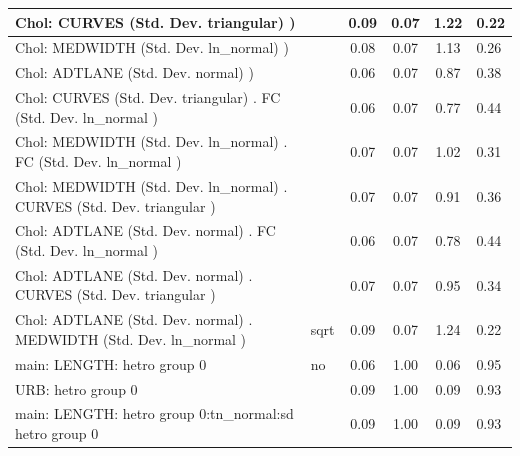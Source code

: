 \begin{table}
\begin{center}
\begin{tabular}{|l|l|c|c|c|l|}
			\hline
			 Chol: CURVES (Std. Dev. triangular) ) &  & 0.09 & 0.07 & 1.22 & 0.22 \\
			\hline
			 Chol: MEDWIDTH (Std. Dev. ln_normal) ) &  & 0.08 & 0.07 & 1.13 & 0.26 \\
			\hline
			 Chol: ADTLANE (Std. Dev. normal) ) &  & 0.06 & 0.07 & 0.87 & 0.38 \\
			\hline
			 Chol: CURVES (Std. Dev. triangular) . FC (Std. Dev.   ln_normal ) &  & 0.06 & 0.07 & 0.77 & 0.44 \\
			\hline
			 Chol: MEDWIDTH (Std. Dev. ln_normal) . FC (Std. Dev.   ln_normal ) &  & 0.07 & 0.07 & 1.02 & 0.31 \\
			\hline
			 Chol: MEDWIDTH (Std. Dev. ln_normal) . CURVES (Std. Dev.   triangular ) &  & 0.07 & 0.07 & 0.91 & 0.36 \\
			\hline
			 Chol: ADTLANE (Std. Dev. normal) . FC (Std. Dev.   ln_normal ) &  & 0.06 & 0.07 & 0.78 & 0.44 \\
			\hline
			 Chol: ADTLANE (Std. Dev. normal) . CURVES (Std. Dev.   triangular ) &  & 0.07 & 0.07 & 0.95 & 0.34 \\
			\hline
			 Chol: ADTLANE (Std. Dev. normal) . MEDWIDTH (Std. Dev.   ln_normal ) & sqrt & 0.09 & 0.07 & 1.24 & 0.22 \\
			\hline
			main: LENGTH: hetro group 0 & no & 0.06 & 1.00 & 0.06 & 0.95 \\
			\hline
			URB: hetro group 0 &  & 0.09 & 1.00 & 0.09 & 0.93 \\
			\hline
			main: LENGTH: hetro group 0:tn_normal:sd  hetro group 0 &  & 0.09 & 1.00 & 0.09 & 0.93 \\
			\hline
		\end{tabular}
	\end{center}
\end{table}